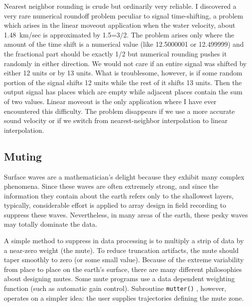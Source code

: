 \par
Nearest neighbor rounding is crude but ordinarily very reliable.
I discovered a very rare numerical roundoff problem
peculiar to signal time-shifting, a problem
which arises in the linear moveout application
when the water velocity, about 1.48~km/sec is approximated by 1.5=3/2.
The problem arises only where the amount of the time shift
is a numerical value (like 12.5000001 or 12.499999)
and the fractional part should be exactly 1/2 but
numerical rounding pushes it randomly in either direction.
We would not care if an entire signal was shifted
by either 12 units or by 13 units.
What is troublesome, however, is if some random portion
of the signal shifts 12 units while the rest of it shifts 13 units.
Then the output signal has places which are empty while
adjacent places contain the sum of two values.
Linear moveout is the only application
where I have ever encountered this difficulty.
The problem disappears if we use a more accurate sound velocity
or if we switch from nearest-neighbor interpolation
to linear interpolation.

\subsection{Muting}
Surface waves are a mathematician's delight
because they exhibit many complex phenomena.
Since these waves are often extremely strong,
and since the information they contain about the earth
refers only to the shallowest layers,
typically,
considerable effort is applied to array design in field recording
to suppress these waves.
Nevertheless, in many areas of the earth,
these pesky waves may totally dominate the data.

\par
A simple method to suppress  in data processing
is to multiply a strip of data by a near-zero weight (the mute).
To reduce truncation artifacts,
the mute should taper smoothly to zero (or some small value).
Because of the extreme variability from place to place
on the earth's surface,
there are many different philosophies
about designing mutes.
Some mute programs use a data dependent weighting function
(such as automatic gain control).
Subroutine \texttt{mutter()} ,
however, operates on a simpler idea:
the user supplies trajectories defining the mute zone.


